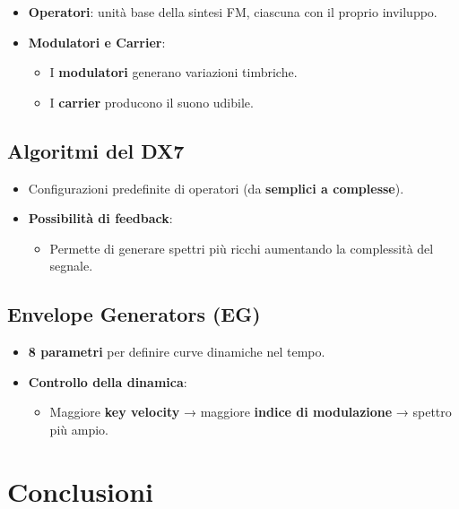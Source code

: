 \begin{itemize}
    \item \textbf{Operatori}: unità base della sintesi FM, ciascuna con il proprio inviluppo.
    \item \textbf{Modulatori e Carrier}:
    \begin{itemize}
        \item I \textbf{modulatori} generano variazioni timbriche.
        \item I \textbf{carrier} producono il suono udibile.
    \end{itemize}
\end{itemize}

\subsection*{Algoritmi del DX7}

\begin{itemize}
    \item Configurazioni predefinite di operatori (da \textbf{semplici a complesse}).
    \item \textbf{Possibilità di feedback}:
    \begin{itemize}
        \item Permette di generare spettri più ricchi aumentando la complessità del segnale.
    \end{itemize}
\end{itemize}

\subsection*{Envelope Generators (EG)}

\begin{itemize}
    \item \textbf{8 parametri} per definire curve dinamiche nel tempo.
    \item \textbf{Controllo della dinamica}:
    \begin{itemize}
        \item Maggiore \textbf{key velocity} → maggiore \textbf{indice di modulazione} → spettro più ampio.
    \end{itemize}
\end{itemize}

\section{Conclusioni}

